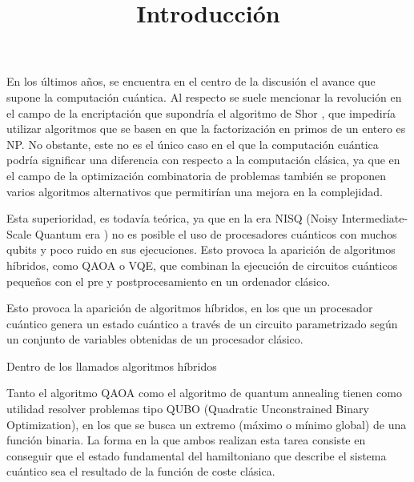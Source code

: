 \documentclass{article}
\title{Introducción}
\begin{document}
\maketitle{}
\tableofcontents{}

\newpage

En los últimos años, se encuentra en el centro de la discusión el avance que supone la computación cuántica. Al respecto se suele mencionar la revolución en el campo de la encriptación que supondría el algoritmo de Shor \cite{Shor_algorithm}, que impediría utilizar algoritmos que se basen en que la factorización en primos de un entero es NP. No obstante, este no es el único caso en el que la computación cuántica podría significar una diferencia con respecto a la computación clásica, ya que en el campo de la optimización combinatoria  %
de problemas también se proponen varios algoritmos alternativos que permitirían una mejora en la complejidad.

Esta superioridad, es todavía teórica, ya que en la era NISQ (Noisy Intermediate-Scale Quantum era \cite{Quantum_computing_in_the_NISQ_era_and_beyond}) no es posible el uso de procesadores cuánticos con muchos qubits y poco ruido  %
en sus ejecuciones. Esto provoca la aparición de algoritmos híbridos, como QAOA \cite{qaoa_paper_original} o VQE, que combinan la ejecución de circuitos cuánticos pequeños con el pre y postprocesamiento en un ordenador clásico.

Esto provoca la aparición de algoritmos híbridos, en los que un procesador cuántico genera un estado cuántico a través de un circuito parametrizado según un conjunto de variables obtenidas de un procesador clásico.

Dentro de los llamados algoritmos híbridos



Tanto el algoritmo QAOA como el algoritmo de quantum annealing tienen como utilidad resolver problemas tipo QUBO (Quadratic Unconstrained Binary Optimization), en los que se busca un extremo (máximo o mínimo global) de una función binaria. La forma en la que ambos realizan esta tarea consiste en conseguir que el estado fundamental del hamiltoniano que describe el sistema cuántico sea el resultado de la función de coste clásica.
\end{document}
